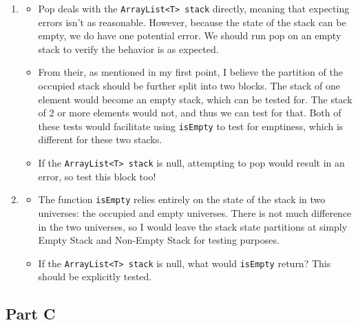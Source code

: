 \documentclass{article}
\newcommand{\Stack}{\texttt{ArrayList<T> stack} }
\begin{document}
\begin{enumerate}
\begin{itemize}
    \end{itemize}
    \item
    \begin{itemize}
        \item Pop deals with the \Stack directly, meaning that expecting errors isn't as reasonable. However, because the state of the stack can be empty, we do have one potential error. We should run pop on an empty stack to verify the behavior is as expected.
        \item From their, as mentioned in my first point, I believe the partition of the occupied stack should be further split into two blocks. The stack of one element would become an empty stack, which can be tested for. The stack of 2 or more elements would not, and thus we can test for that. Both of these tests would facilitate using \texttt{isEmpty} to test for emptiness, which is different for these two stacks.
        \item If the \Stack is null, attempting to pop would result in an error, so test this block too!
    \end{itemize}
    \item
    \begin{itemize}
        \item The function \texttt{isEmpty} relies entirely on the state of the stack in two universes: the occupied and empty universes. There is not much difference in the two universes, so I would leave the stack state partitions at simply Empty Stack and Non-Empty Stack for testing purposes.
        \item If the \Stack is null, what would \texttt{isEmpty} return? This should be explicitly tested.
    \end{itemize}
\end{enumerate}

\subsection*{Part C}
\end{document}

